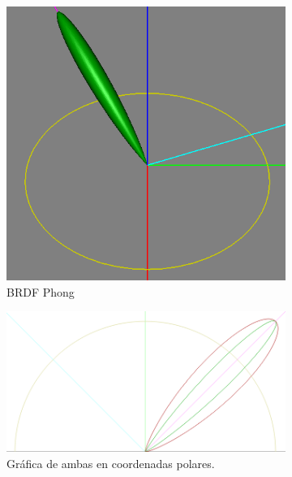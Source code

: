 \begin{figure}[H]
	\centering
	\begin{subfigure}[t]{0.3\textwidth}
		\centering
		\captionsetup{justification=centering}
		\includegraphics[width=\linewidth]{media/phong_lobule.png}
		\caption*{\ac{BRDF} Phong}
	\end{subfigure}\hfill
	\begin{subfigure}[t]{0.35\textwidth}
		\centering
		\captionsetup{justification=centering}
		\includegraphics[width=\linewidth]{media/BlinnPhonglobules.png}
		\caption*{Gráfica de ambas en coordenadas polares.}
	\end{subfigure}\hfill
	\begin{subfigure}[t]{0.3\textwidth}
		\centering

\end{subfigure}
\end{figure}
